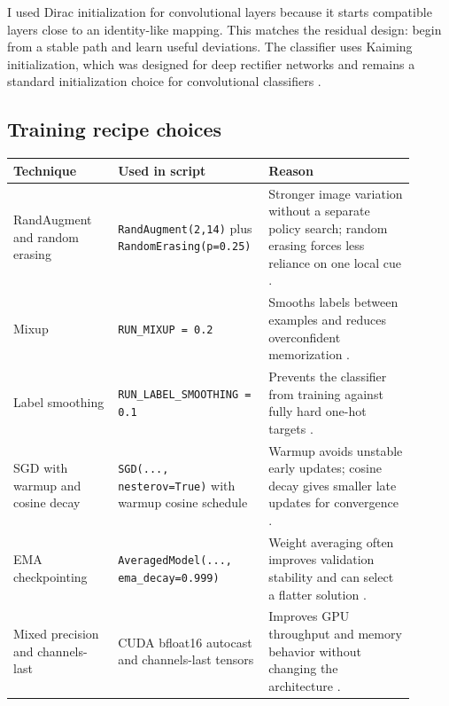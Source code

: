 \documentclass[11pt]{article}
\begin{document}
I used Dirac initialization for convolutional layers because it starts compatible
layers close to an identity-like mapping. This matches the residual design: begin from a
stable path and learn useful deviations. The classifier uses Kaiming initialization,
which was designed for deep rectifier networks and remains a standard initialization
choice for convolutional classifiers \cite{he2015rectifiers}.

\subsection{Training recipe choices}

\begin{center}
\begin{tabular}{p{0.25\linewidth}p{0.30\linewidth}p{0.35\linewidth}}
\toprule
\textbf{Technique} & \textbf{Used in script} & \textbf{Reason} \\
\midrule
RandAugment and random erasing & \texttt{RandAugment(2,14)} plus
\texttt{RandomErasing(p=0.25)} & Stronger image variation without a separate policy
search; random erasing forces less reliance on one local cue
\cite{cubuk2020randaugment,zhong2020randomerasing}. \\
Mixup & \texttt{RUN\_MIXUP = 0.2} & Smooths labels between examples and reduces
overconfident memorization \cite{zhang2018mixup}. \\
Label smoothing & \texttt{RUN\_LABEL\_SMOOTHING = 0.1} & Prevents the classifier from
training against fully hard one-hot targets \cite{szegedy2016inception}. \\
SGD with warmup and cosine decay & \texttt{SGD(..., nesterov=True)} with warmup cosine
schedule & Warmup avoids unstable early updates; cosine decay gives smaller late
updates for convergence \cite{goyal2017largebatch,loshchilov2017sgdr}. \\
EMA checkpointing & \texttt{AveragedModel(..., ema\_decay=0.999)} & Weight averaging
often improves validation stability and can select a flatter solution
\cite{izmailov2018swa,tarvainen2017meanteacher}. \\
Mixed precision and channels-last & CUDA bfloat16 autocast and channels-last tensors &
Improves GPU throughput and memory behavior without changing the architecture
\cite{micikevicius2018mixed,pytorchchannelslast}. \\
\bottomrule
\end{tabular}
\end{center}

\clearpage
\end{document}
